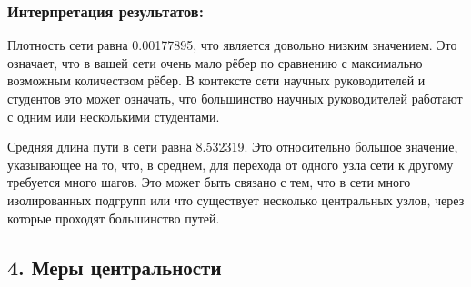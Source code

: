 \documentclass[
]{article}
\begin{document}
\hypertarget{ux438ux43dux442ux435ux440ux43fux440ux435ux442ux430ux446ux438ux44f-ux440ux435ux437ux443ux43bux44cux442ux430ux442ux43eux432}{%
\subsubsection{Интерпретация
результатов:}\label{ux438ux43dux442ux435ux440ux43fux440ux435ux442ux430ux446ux438ux44f-ux440ux435ux437ux443ux43bux44cux442ux430ux442ux43eux432}}

Плотность сети равна 0.00177895, что является довольно низким значением.
Это означает, что в вашей сети очень мало рёбер по сравнению с
максимально возможным количеством рёбер. В контексте сети научных
руководителей и студентов это может означать, что большинство научных
руководителей работают с одним или несколькими студентами.

Средняя длина пути в сети равна 8.532319. Это относительно большое
значение, указывающее на то, что, в среднем, для перехода от одного узла
сети к другому требуется много шагов. Это может быть связано с тем, что
в сети много изолированных подгрупп или что существует несколько
центральных узлов, через которые проходят большинство путей.

\hypertarget{ux43cux435ux440ux44b-ux446ux435ux43dux442ux440ux430ux43bux44cux43dux43eux441ux442ux438}{%
\subsection{4. Меры
центральности}\label{ux43cux435ux440ux44b-ux446ux435ux43dux442ux440ux430ux43bux44cux43dux43eux441ux442ux438}}
\end{document}
